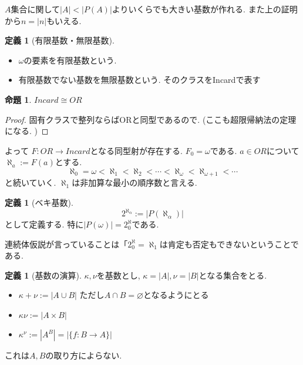 \documentclass[dvipdfmx,a4paper,11pt]{article}
\theoremstyle{definition}
\newtheorem{prop}[thm]{命題}
\newtheorem{dfn}[thm]{定義}
\begin{document}
$A$集合に関して$|A| < |P(A)|$よりいくらでも大きい基数が作れる. また上の証明から$n=|n|$もいえる. 

 \begin{tcolorbox}
 [colback = white, colframe = green!35!black, fonttitle = \bfseries,breakable = true]
\begin{dfn}[有限基数・無限基数]
\begin{itemize}
\item $\omega$の要素を有限基数という.
\item 有限基数でない基数を無限基数という. そのクラスをIncardで表す
\end{itemize}
\end{dfn}
\end{tcolorbox}

 \begin{tcolorbox}
 [colback = white, colframe = green!35!black, fonttitle = \bfseries,breakable = true]
\begin{prop}
$Incard \cong OR$
\end{prop}
\end{tcolorbox}
\begin{proof}
固有クラスで整列ならばORと同型であるので. (ここも超限帰納法の定理になる. )
\end{proof}
よって
$F : OR \to Incard$となる同型射が存在する.
$F_{0}= \omega$である. 
$a \in OR$について$\aleph_{a}:=F(a)$とする. 
$$
\aleph_0 = \omega < \aleph_1 <\aleph_2 < \cdots < \aleph_{\omega}<\aleph_{\omega+1}<\cdots
$$
と続いていく. 
$\aleph_1 $は非加算な最小の順序数と言える. 

 \begin{tcolorbox}
 [colback = white, colframe = green!35!black, fonttitle = \bfseries,breakable = true]
\begin{dfn}[ベキ基数]
$$
2^{\aleph_\alpha} := |P(\aleph_\alpha)|
$$
として定義する. 特に$|P(\omega)|=2^\aleph_0 $である. 
\end{dfn}
\end{tcolorbox}

連続体仮説が言っていることは「$2^\aleph_0 = \aleph_1 $は肯定も否定もできないということである. 

 \begin{tcolorbox}
 [colback = white, colframe = green!35!black, fonttitle = \bfseries,breakable = true]
\begin{dfn}[基数の演算]
$\kappa, \nu$を基数とし, $\kappa = |A|, \nu=|B|$となる集合をとる. 
\begin{itemize}
\item $\kappa + \nu := |A \cup B|$ ただし$A \cap B=\varnothing$となるようにとる
\item $\kappa \nu := |A \times B|$
\item $\kappa^{\nu} := |A^B|=|\{ f : B \to A\}|$
\end{itemize}
これは$A,B$の取り方によらない. 
\end{dfn}
\end{tcolorbox}
\end{document}
